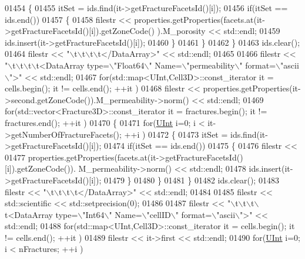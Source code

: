 \begin{DoxyCode}
01454         \{
01455             itSet = ids.find(it->getFractureFacetsId()[i]);
01456             \textcolor{keywordflow}{if}(itSet == ids.end())
01457             \{
01458                   filestr << properties.getProperties(facets.at(it->getFractureFacetsId()[i]).getZoneCode()
      ).M\_porosity << std::endl;
01459                   ids.insert(it->getFractureFacetsId()[i]);
01460             \}
01461         \}
01462     \}
01463     ids.clear();
01464     filestr << \textcolor{stringliteral}{"\(\backslash\)t\(\backslash\)t\(\backslash\)t\(\backslash\)t</DataArray>"} << std::endl;
01465 
01466     filestr << \textcolor{stringliteral}{"\(\backslash\)t\(\backslash\)t\(\backslash\)t\(\backslash\)t<DataArray type=\(\backslash\)"Float64\(\backslash\)" Name=\(\backslash\)"permeability\(\backslash\)" format=\(\backslash\)"ascii\(\backslash\)">"} << std::endl;
01467     \textcolor{keywordflow}{for}(std::map<UInt,Cell3D>::const\_iterator it = cells.begin(); it != cells.end(); ++it )
01468         filestr << properties.getProperties(it->second.getZoneCode()).M\_permeability->norm() << std::endl;
01469     \textcolor{keywordflow}{for}(std::vector<Fracture3D>::const\_iterator it = fractures.begin(); it != fractures.end(); ++it )
01470     \{
01471         \textcolor{keywordflow}{for}(\hyperlink{namespaceFVCode3D_a4bf7e328c75d0fd504050d040ebe9eda}{UInt} i=0; i < it->getNumberOfFractureFacets(); ++i )
01472         \{
01473             itSet = ids.find(it->getFractureFacetsId()[i]);
01474             \textcolor{keywordflow}{if}(itSet == ids.end())
01475             \{
01476                   filestr <<
01477                   properties.getProperties(facets.at(it->getFractureFacetsId()[i]).getZoneCode()).
      M\_permeability->norm() << std::endl;
01478                   ids.insert(it->getFractureFacetsId()[i]);
01479             \}
01480         \}
01481     \}
01482     ids.clear();
01483     filestr << \textcolor{stringliteral}{"\(\backslash\)t\(\backslash\)t\(\backslash\)t\(\backslash\)t</DataArray>"} << std::endl;
01484 
01485     filestr << std::scientific << std::setprecision(0);
01486 
01487     filestr << \textcolor{stringliteral}{"\(\backslash\)t\(\backslash\)t\(\backslash\)t\(\backslash\)t<DataArray type=\(\backslash\)"Int64\(\backslash\)" Name=\(\backslash\)"cellID\(\backslash\)" format=\(\backslash\)"ascii\(\backslash\)">"} << std::endl;
01488     \textcolor{keywordflow}{for}(std::map<UInt,Cell3D>::const\_iterator it = cells.begin(); it != cells.end(); ++it )
01489         filestr << it->first << std::endl;
01490     \textcolor{keywordflow}{for}(\hyperlink{namespaceFVCode3D_a4bf7e328c75d0fd504050d040ebe9eda}{UInt} i=0; i < nFractures; ++i )

\end{DoxyCode}

